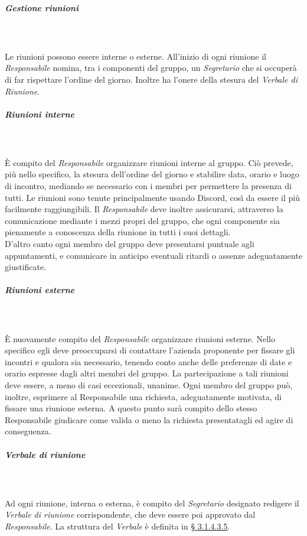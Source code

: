\subparagraph{Gestione riunioni}\mbox{} \\ \mbox{} \\
Le riunioni possono essere interne o esterne. All'inizio di ogni riunione il \textit{Responsabile} nomina, tra i componenti del gruppo, un \textit{Segretario} che si occuperà di far rispettare l'ordine del giorno. Inoltre ha l'onere della stesura del \textit{Verbale di Riunione}\glo.

\subparagraph*{Riunioni interne} \mbox{} \\ \mbox{} \\
È compito del \textit{Responsabile} organizzare riunioni interne al gruppo. Ciò prevede, più nello specifico, la stesura dell'ordine del giorno e
stabilire data, orario e luogo di incontro, mediando se necessario con i membri per permettere la presenza di tutti. Le riunioni sono tenute principalmente usando Discord, così da essere il più facilmente raggiungibili.
Il \textit{Responsabile} deve inoltre assicurarsi, attraverso la comunicazione
mediante i mezzi propri del gruppo, che ogni componente sia pienamente a conoscenza della riunione in tutti i suoi dettagli. \\
D'altro canto ogni membro del gruppo deve presentarsi puntuale agli appuntamenti,
e comunicare in anticipo eventuali ritardi o assenze adeguatamente giustificate.

\subparagraph*{Riunioni esterne} \mbox{} \\ \mbox{} \\
È nuovamente compito del \textit{Responsabile} organizzare riunioni esterne.
Nello specifico egli deve preoccuparsi di contattare l'azienda proponente per fissare gli
incontri e qualora sia necessario, tenendo conto anche delle preferenze di date e orario
espresse dagli altri membri del gruppo. La partecipazione a tali riunioni deve essere,
a meno di casi eccezionali, unanime.
Ogni membro del gruppo può, inoltre, esprimere al Responsabile una richiesta, adeguatamente motivata, di fissare una riunione esterna. A questo punto sarà compito
dello stesso Responsabile giudicare come valida o meno la richiesta presentatagli ed
agire di conseguenza.

\subparagraph*{Verbale di riunione} \mbox{} \\ \mbox{} \\
Ad ogni riunione, interna o esterna, è compito del \textit{Segretario} designato redigere il \textit{Verbale di riunione} corrispondente, che deve essere poi approvato dal \textit{Responsabile}. La struttura del \textit{Verbale} è definita in \hyperref[par:verbali]{§ 3.1.4.3.5}.
